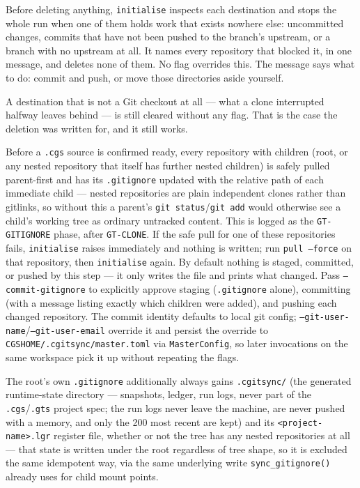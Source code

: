 Before deleting anything, \texttt{initialise} inspects each destination and
stops the whole run when one of them holds work that exists nowhere else:
uncommitted changes, commits that have not been pushed to the branch's
upstream, or a branch with no upstream at all. It names every repository that
blocked it, in one message, and deletes none of them. No flag overrides this.
The message says what to do: commit and push, or move those directories aside
yourself.

A destination that is not a Git checkout at all --- what a clone interrupted
halfway leaves behind --- is still cleared without any flag. That is the case
the deletion was written for, and it still works.

Before a \texttt{.cgs} source is confirmed ready, every repository with
children (root, or any nested repository that itself has further nested
children) is safely pulled parent-first and has its \texttt{.gitignore}
updated with the relative path of each immediate child --- nested
repositories are plain independent clones rather than gitlinks, so without
this a parent's \texttt{git status}/\texttt{git add} would otherwise see a
child's working tree as ordinary untracked content. This is logged as the
\texttt{GT-GITIGNORE} phase, after \texttt{GT-CLONE}. If the safe pull for
one of these repositories fails, \texttt{initialise} raises immediately and
nothing is written; run \texttt{pull --force} on that repository, then
\texttt{initialise} again.
By default nothing is staged, committed, or pushed by this step --- it only
writes the file and prints what changed. Pass \texttt{--commit-gitignore}
to explicitly approve staging (\texttt{.gitignore} alone), committing (with
a message listing exactly which children were added), and pushing each
changed repository. The commit identity defaults to local git config;
\texttt{--git-user-name}/\texttt{--git-user-email} override it and persist
the override to \texttt{CGSHOME/.cgitsync/master.toml} via
\texttt{MasterConfig}, so later invocations on the same workspace pick it up
without repeating the flags.

The root's own \texttt{.gitignore} additionally always gains
\texttt{.cgitsync/} (the generated runtime-state directory --- snapshots,
ledger, run logs, never part of the \texttt{.cgs}/\texttt{.gts} project
spec; the run logs never leave the machine, are never pushed with a memory,
and only the 200 most recent are kept) and its \texttt{<project-name>.lgr} register file, whether or not the
tree has any nested repositories at all --- that state is written under the
root regardless of tree shape, so it is excluded the same idempotent way,
via the same underlying write \texttt{sync\_gitignore()} already uses for
child mount points.

